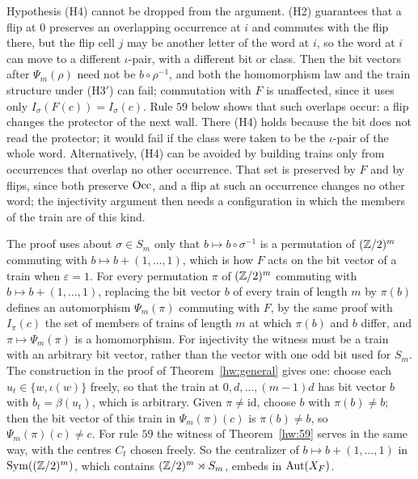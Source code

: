 \begin{remark}\label{hw:H4}
Hypothesis (H4) cannot be dropped from the argument. (H2) guarantees that a flip at $0$ preserves an overlapping occurrence at $i$ and commutes with the flip there, but the flip cell $j$ may be another letter of the word at $i$, so the word at $i$ can move to a different $\iota$-pair, with a different bit or class. Then the bit vectors after $\Psi_m(\rho)$ need not be $b\circ\rho^{-1}$, and both the homomorphism law and the train structure under (H3$'$) can fail; commutation with $F$ is unaffected, since it uses only $I_\sigma(F(c))=I_\sigma(c)$. Rule $59$ below shows that such overlaps occur: a flip changes the protector of the next wall. There (H4) holds because the bit does not read the protector; it would fail if the class were taken to be the $\iota$-pair of the whole word. Alternatively, (H4) can be avoided by building trains only from occurrences that overlap no other occurrence. That set is preserved by $F$ and by flips, since both preserve $\operatorname{Occ}$, and a flip at such an occurrence changes no other word; the injectivity argument then needs a configuration in which the members of the train are of this kind.
\end{remark}

\begin{remark}\label{hw:cent}
The proof uses about $\sigma\in S_m$ only that $b\mapsto b\circ\sigma^{-1}$ is a permutation of $(\mathbb{Z}/2)^m$ commuting with $b\mapsto b+(1,\dots,1)$, which is how $F$ acts on the bit vector of a train when $\varepsilon=1$. For every permutation $\pi$ of $(\mathbb{Z}/2)^m$ commuting with $b\mapsto b+(1,\dots,1)$, replacing the bit vector $b$ of every train of length $m$ by $\pi(b)$ defines an automorphism $\Psi_m(\pi)$ commuting with $F$, by the same proof with $I_\pi(c)$ the set of members of trains of length $m$ at which $\pi(b)$ and $b$ differ, and $\pi\mapsto\Psi_m(\pi)$ is a homomorphism. For injectivity the witness must be a train with an arbitrary bit vector, rather than the vector with one odd bit used for $S_m$. The construction in the proof of Theorem~\ref{hw:general} gives one: choose each $u_t\in\{w,\iota(w)\}$ freely, so that the train at $0,d,\dots,(m-1)d$ has bit vector $b$ with $b_t=\beta(u_t)$, which is arbitrary. Given $\pi\ne\mathrm{id}$, choose $b$ with $\pi(b)\ne b$; then the bit vector of this train in $\Psi_m(\pi)(c)$ is $\pi(b)\ne b$, so $\Psi_m(\pi)(c)\ne c$. For rule $59$ the witness of Theorem~\ref{hw:59} serves in the same way, with the centres $C_t$ chosen freely. So the centralizer of $b\mapsto b+(1,\dots,1)$ in $\operatorname{Sym}((\mathbb{Z}/2)^m)$, which contains $(\mathbb{Z}/2)^m\rtimes S_m$, embeds in $\operatorname{Aut}(X_F)$.
\end{remark}

